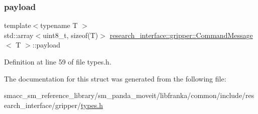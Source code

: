 \mbox{\label{structresearch__interface_1_1gripper_1_1CommandMessage_ac59db82ea1c4c1da955d22f8eac3c2df}} 
\subsubsection{\texorpdfstring{payload}{payload}}
{\footnotesize\ttfamily template$<$typename T $>$ \\
std\+::array$<$uint8\+\_\+t, sizeof(T)$>$ \hyperlink{structresearch__interface_1_1gripper_1_1CommandMessage}{research\+\_\+interface\+::gripper\+::\+Command\+Message}$<$ T $>$\+::payload}



Definition at line 59 of file types.\+h.



The documentation for this struct was generated from the following file\+:\begin{DoxyCompactItemize}
\item 
smacc\+\_\+sm\+\_\+reference\+\_\+library/sm\+\_\+panda\+\_\+moveit/libfranka/common/include/research\+\_\+interface/gripper/\hyperlink{types_8h}{types.\+h}\end{DoxyCompactItemize}
